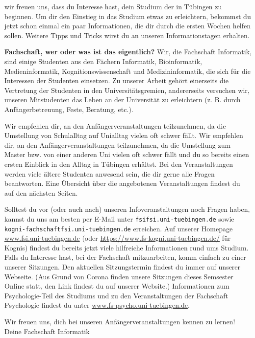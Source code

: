 wir freuen uns, dass du Interesse hast, dein Studium der \studiengang in Tübingen zu beginnen.
Um dir den Einstieg in das Studium etwas zu erleichtern, bekommst du jetzt schon einmal
ein paar Informationen, die dir durch die ersten Wochen helfen sollen.
Weitere Tipps und Tricks wirst du an unseren Informationstagen %
erhalten.

\textbf{\glqq Fachschaft\grqq, wer oder was ist das eigentlich?} Wir, die Fachschaft Informatik, sind einige Studenten aus den Fächern
Informatik, Bioinformatik, Medieninformatik, Kognitionswissenschaft und Medizin\-informatik, die sich für die Interessen der Studenten einsetzen. Zu unserer Arbeit
gehört einerseits die Vertretung der Studenten in den Universitätsgremien, andererseits versuchen wir, unseren
Mitstudenten das Leben an der Universität zu erleichtern (z. B. durch Anfängerbetreuung, Feste,
Beratung, etc.).

\ifbachelor 
Wir empfehlen dir, an den Anfängerveranstaltungen teilzunehmen, da die Umstellung von Schulalltag
auf Unialltag vielen oft schwer fällt. 
\fi
\ifmaster
Wir empfehlen dir, an den Anfängerveranstaltungen teilzunehmen, da die Umstellung zum Master bzw. von einer anderen Uni vielen oft schwer fällt und du so bereits einen ersten Einblick in den Alltag in Tübingen erhältst.
\fi 
Bei den Veranstaltungen werden viele ältere Studenten
anwesend sein, die dir gerne alle Fragen beantworten. Eine Übersicht über die angebotenen
Veranstaltungen findest du auf den nächsten Seiten.

Solltest du vor (oder auch nach) unseren Infoveranstaltungen noch Fragen haben, kannst du uns
am besten per E-Mail unter \texttt{fsi\At fsi.uni-tuebingen.de} 
\ifkogwiss
sowie \texttt{kogni-fachschaft\At fsi.uni-tuebingen.de}
\fi
erreichen. Auf unserer Homepage
\url{www.fsi.uni-tuebingen.de} (oder \url{https://www.fs-kogni.uni-tuebingen.de/} für Kognis) findest du bereits jetzt viele hilfreiche Informationen rund
ums Studium. Falls du Interesse hast, bei der Fachschaft mitzuarbeiten, komm einfach zu einer unserer Sitzungen. Den aktuellen Sitzungstermin findest du immer auf unserer Webseite. (Aus Grund von Corona finden unsere Sitzungen dieses Semsester Online statt, den Link findest du auf unserer Website.)
\ifkogwiss  Informationen zum Psychologie-Teil des Studiums und zu den Veranstaltungen der
Fachschaft Psychologie findest du unter \url{www.fs-psycho.uni-tuebingen.de}.\fi

Wir freuen uns, dich bei unseren Anfängerveranstaltungen kennen zu lernen!\\
Deine Fachschaft Informatik
\vfill
